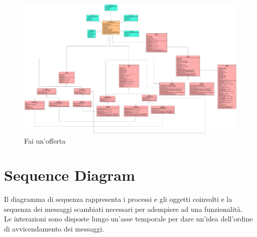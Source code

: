         \begin{figure}[htbp!]
            \centering
                \includegraphics[width=1\linewidth]{Immagini/Diagrammi/Class Diagram/Analisi/Venditore e compratore/FaiOfferta.pdf}
            \caption{Fai un'offerta}
        \end{figure}

    \clearpage
    
    \section{Sequence Diagram}
        Il diagramma di sequenza rappresenta i processi e gli oggetti coinvolti e la sequenza dei messaggi scambiati necessari per adempiere ad una funzionalità. \\
        Le interazioni sono disposte lungo un'asse temporale per dare un'idea dell'ordine di avvicendamento dei messaggi.

